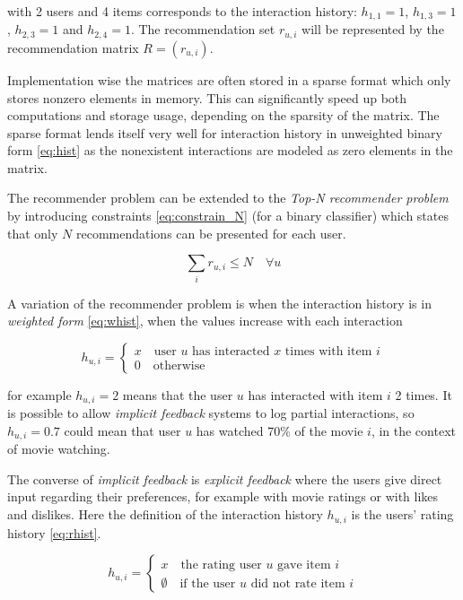 with 2 users and 4 items corresponds to the interaction history: $h_{1, 1} = 1$, $h_{1, 3} = 1$, $h_{2, 3} = 1$ and $h_{2, 4} = 1$.  The recommendation set $r_{u, i}$ will be represented by the recommendation matrix $R = (r_{u, i})$.

Implementation wise the matrices are often stored in a sparse format which only stores nonzero elements in memory. This can significantly speed up both computations and storage usage, depending on the sparsity of the matrix. The sparse format lends itself very well for interaction history in unweighted binary form \eqref{eq:hist} as the nonexistent interactions are modeled as zero elements in the matrix.

The recommender problem can be extended to the \textit{Top-N recommender problem} by introducing constraints \eqref{eq:constrain_N} (for a binary classifier) which states that only $N$ recommendations can be presented for each user.

\begin{equation}\label{eq:constrain_N}
    \sum_i r_{u, i} \leq N \quad \forall u
\end{equation}

A variation of the recommender problem is when the interaction history is in \textit{weighted form} \eqref{eq:whist}, when the values increase with each interaction

\begin{equation}\label{eq:whist}
    h_{u, i} = \begin{cases}
        x \quad \text{user $u$ has interacted $x$ times with item $i$} \\
        0 \quad \text{otherwise}
    \end{cases}
\end{equation}

for example $h_{u, i} = 2$ means that the user $u$ has interacted with item $i$ 2 times. It is possible to allow \textit{implicit feedback} systems to log partial interactions, so $h_{u, i} = 0.7$ could mean that user $u$ has watched 70\% of the movie $i$, in the context of movie watching. \citep{hu2008collaborative}

The converse of \textit{implicit feedback} is \textit{explicit feedback} where the users give direct input regarding their preferences, for example with movie ratings or with likes and dislikes.  Here the definition of the interaction history $h_{u, i}$ is the users' rating history \eqref{eq:rhist}.

\begin{equation}\label{eq:rhist}
    h_{u, i} = \begin{cases}
        x \quad \text{the rating user $u$ gave item $i$} \\
        \emptyset \quad \text{if the user $u$ did not rate item $i$}
    \end{cases}
\end{equation}


